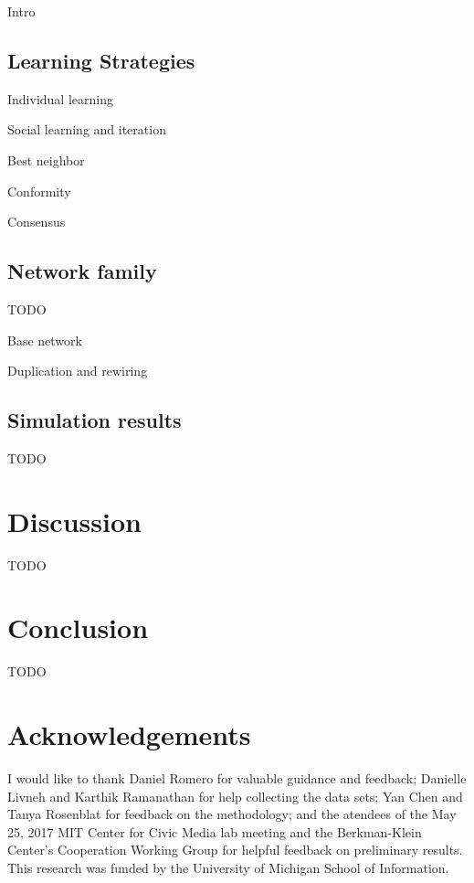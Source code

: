 \documentclass[10pt,twocolumn]{article}
\newcommand{\+}{\phantom{-}}
\begin{document}
Intro

\subsection{Learning Strategies}

Individual learning

Social learning and iteration

Best neighbor

Conformity

Consensus

\subsection{Network family}

TODO

Base network

Duplication and rewiring

\subsection{Simulation results}

TODO

\section{Discussion}
TODO

\section{Conclusion}
TODO

\section{Acknowledgements}
I would like to thank Daniel Romero for valuable guidance and feedback;
Danielle Livneh and Karthik Ramanathan for help collecting the data sets;
Yan Chen and Tanya Rosenblat for feedback on the methodology;
and the atendees of the May 25, 2017 MIT Center for Civic Media lab meeting and
the Berkman-Klein Center's Cooperation Working Group for helpful feedback on
preliminary results.
This research was funded by the University of Michigan School of Information.

%



 
\end{document}
